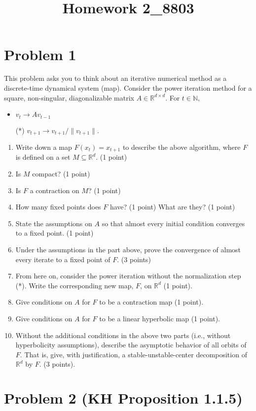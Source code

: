 \documentclass[12pt]{article}
\title{Homework 2_8803}
\begin{document}
\MakeScribeTop

\section*{Problem 1}
This problem asks you to think about an iterative numerical method as a discrete-time dynamical system (map). Consider the power iteration method for a square, non-singular, diagonalizable matrix $A \in \mathbb{R}^{d\times d}.$ For $t \in \mathbb{N},$
\begin{itemize}
	\item $v_t \to Av_{t-1}$
	\item[(*)] $v_{t+1} \to v_{t+1}/\|v_{t+1}\|.$
\end{itemize}
\begin{enumerate}
	\item Write down a map $F(x_t) = x_{t+1}$ to describe the above algorithm, where $F$ is defined on a set $M \subseteq \mathbb{R}^d$. (1 point)
	\item Is $M$ compact? (1 point)
	\item Is $F$ a contraction on $M$? (1 point)
	\item How many fixed points does $F$ have? (1 point) What are they? (1 point)
	\item State the assumptions on $A$ so that almost every initial condition converges to a fixed point. (1 point)
	\item Under the assumptions in the part above, prove the convergence of almost every iterate to a fixed point of $F.$ (3 points)
	\item From here on, consider the power iteration without the normalization step (*). Write the corresponding new map, $F$, on $\mathbb{R}^d$ (1 point).
	\item Give conditions on $A$ for $F$ to be a contraction map (1 point).
	\item Give conditions on $A$ for $F$ to be a linear hyperbolic map (1 point).
	\item Without the additional conditions in the above two parts (i.e., without hyperbolicity assumptions), describe the asymptotic behavior of all orbits of $F.$ That is, give, with justification, a stable-unstable-center decomposition of $\mathbb{R}^d$ by $F.$ (3 points).

\end{enumerate}

\section*{Problem 2 (KH Proposition 1.1.5)}
\end{document}
